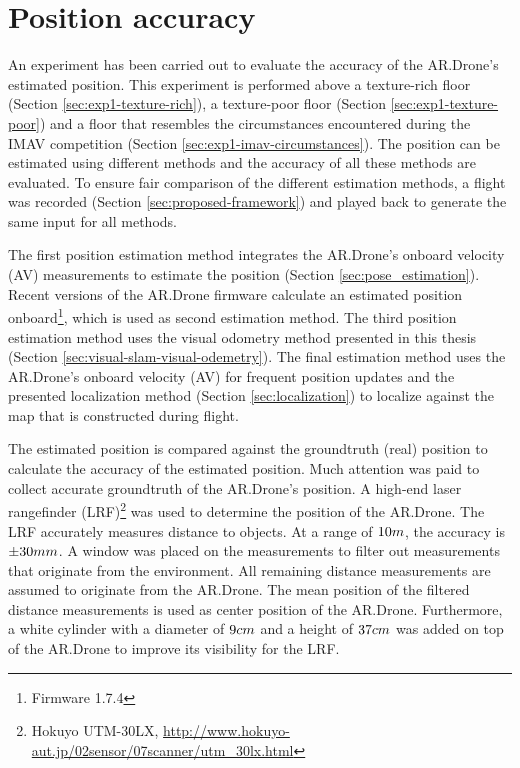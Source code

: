 \section{Position accuracy}
\label{sec:results-position-accuracy}
An experiment has been carried out to evaluate the accuracy of the AR.Drone's estimated position.
This experiment is performed above a texture-rich floor (Section \ref{sec:exp1-texture-rich}), a texture-poor floor (Section \ref{sec:exp1-texture-poor}) and a floor that resembles the circumstances encountered during the IMAV competition (Section \ref{sec:exp1-imav-circumstances}).
The position can be estimated using different methods and the accuracy of all these methods are evaluated.
To ensure fair comparison of the different estimation methods, a flight was recorded (Section \ref{sec:proposed-framework}) and played back to generate the same input for all methods.

The first position estimation method integrates the AR.Drone's onboard velocity (AV) measurements to estimate the position (Section \ref{sec:pose_estimation}).
Recent versions of the AR.Drone firmware calculate an estimated position onboard\footnote{Firmware 1.7.4}, which is used as second estimation method.
The third position estimation method uses the visual odometry method presented in this thesis (Section \ref{sec:visual-slam-visual-odemetry}).
The final estimation method uses the AR.Drone's onboard velocity (AV) for frequent position updates and the presented localization method (Section \ref{sec:localization}) to localize against the map that is constructed during flight.

The estimated position is compared against the groundtruth (real) position to calculate the accuracy of the estimated position.
Much attention was paid to collect accurate groundtruth of the AR.Drone's position.
A high-end laser rangefinder (LRF)\footnote{Hokuyo UTM-30LX, \url{http://www.hokuyo-aut.jp/02sensor/07scanner/utm_30lx.html}} was used to determine the position of the AR.Drone.
The LRF accurately measures distance to objects.
At a range of $10\small{m}$, the accuracy is $\pm30\small{mm}$.
A window was placed on the measurements to filter out measurements that originate from the environment.
All remaining distance measurements are assumed to originate from the AR.Drone.
The mean position of the filtered distance measurements is used as center position of the AR.Drone.
Furthermore, a white cylinder with a diameter of $9\begin{small}cm\end{small}$ and a height of $37\begin{small}cm\end{small}$ was added on top of the AR.Drone to improve its visibility for the LRF.


